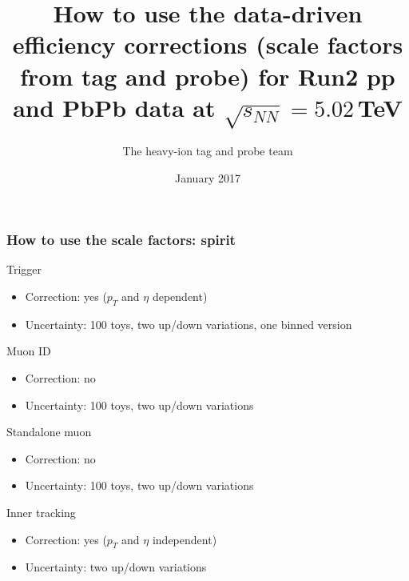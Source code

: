 \documentclass[9pt]{beamer}
\date[]{January 2017}
\title[]{How to use the data-driven efficiency corrections (scale factors from tag and probe) for Run2 pp and PbPb data at $\sqrt{s_{NN}} = 5.02$\,TeV}
\author[]{The heavy-ion tag and probe team}
\begin{document}
\begin{frame}[plain]
 \maketitle
\end{frame}

 \begin{frame}[plain]
  \frametitle{How to use the scale factors: spirit}
  
  
  \begin{block}{Trigger}
   \begin{itemize}
    \item Correction: yes ($p_{T}$ and $\eta$ dependent)
    \item Uncertainty: 100 toys, two up/down variations, one binned version
   \end{itemize}
  \end{block}
  
  \begin{block}{Muon ID}
   \begin{itemize}
    \item Correction: no
    \item Uncertainty: 100 toys, two up/down variations
   \end{itemize}
  \end{block}

  \begin{block}{Standalone muon}
   \begin{itemize}
    \item Correction: no
    \item Uncertainty: 100 toys, two up/down variations
   \end{itemize}
  \end{block}
  
  \begin{block}{Inner tracking}
   \begin{itemize}
    \item Correction: yes ($p_{T}$ and $\eta$ independent)
    \item Uncertainty: two up/down variations
   \end{itemize}
  \end{block}

 \end{frame}
 
\end{document}
